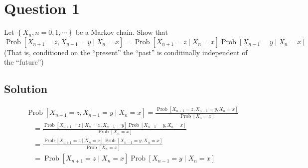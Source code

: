 \section*{Question 1}

Let \( \left \{ X_{n}, n=0,1, \cdots \right \} \) be a Markov chain.
Show that
\[
    \operatorname{Prob}\left[X_{n+1}=z, X_{n-1}=y \mid X_{n}=x\right]=\operatorname{Prob}\left[X_{n+1}=z \mid X_{n}=x\right] \operatorname{Prob}\left[X_{n-1}=y \mid X_{n}=x\right]
\]
(That is, conditioned on the ``present'' the ``past'' is conditinally independent of the ``future'')

\subsection*{Solution}

\begin{align*}
     &
    \operatorname{Prob}\left[X_{n+1}=z, X_{n-1}=y \mid X_{n}=x\right]
    =
    \frac{
        \operatorname{Prob}\left[X_{n+1}=z, X_{n-1}=y, X_{n}=x\right]
    }{
        \operatorname{Prob}\left[X_{n}=x\right]
    }
    \\ & \quad =
    \frac{
        \operatorname{Prob}\left[X_{n+1}=z \mid X_{n}=x, X_{n-1}=y\right] \operatorname{Prob}\left[X_{n-1}=y, X_{n}=x\right]
    }{
        \operatorname{Prob}\left[X_{n}=x\right]
    }
    \\ & \quad =
    \frac{
        \operatorname{Prob}\left[X_{n+1}=z \mid X_{n}=x\right] \operatorname{Prob}\left[X_{n-1}=y, X_{n}=x\right]
    }{
        \operatorname{Prob}\left[X_{n}=x\right]
    }
    \\ & \quad =
    \operatorname{Prob}\left[X_{n+1}=z \mid X_{n}=x\right] \operatorname{Prob}\left[X_{n-1}=y \mid X_{n}=x\right]
\end{align*}

